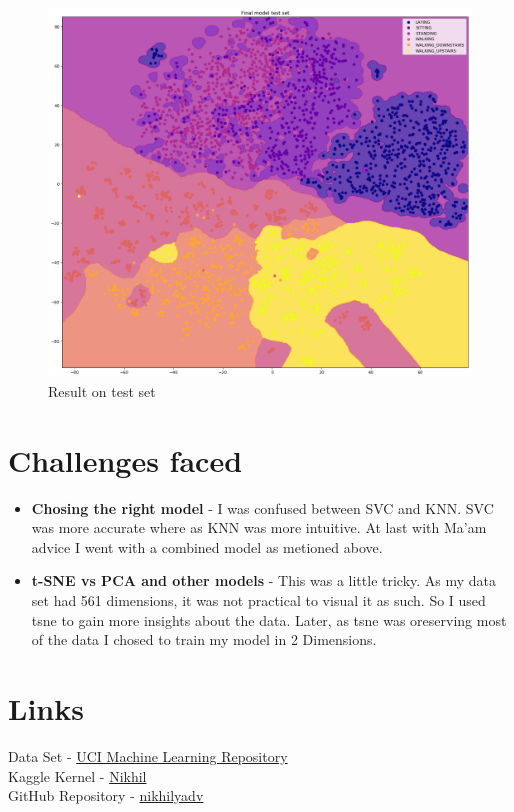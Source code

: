 \documentclass[12pt]{article}
\begin{document}
\begin{figure}[H]
	\centering
	\includegraphics[scale=0.30]{result_test.png}
	\caption{Result on test set}
\end{figure}\noindent
\section{Challenges faced}
\begin{itemize}
	\item \textbf{Chosing the right model} - I was confused between SVC and KNN. SVC was more accurate where as KNN was more intuitive. At last with Ma'am advice I went with a combined model as metioned above.
	\item \textbf{t-SNE vs PCA and other models} - This was a little tricky. As my data set had 561 dimensions, it was not practical to visual it as such. So I used tsne to gain more insights about the data. Later, as tsne was oreserving most of the data I chosed to train my model in 2 Dimensions.
\end{itemize}
\section{Links}
	Data Set - \href{https://archive.ics.uci.edu/ml/datasets/Human+Activity+Recognition+Using+Smartphones}{UCI Machine Learning Repository}\\
	Kaggle Kernel - \href{https://www.kaggle.com/nikhilyadv/kernelb8e59d4169}{Nikhil}\\
	GitHub Repository - \href{https://github.com/nikhilyadv/Human-Activity-Detection}{nikhilyadv}
\end{document}
